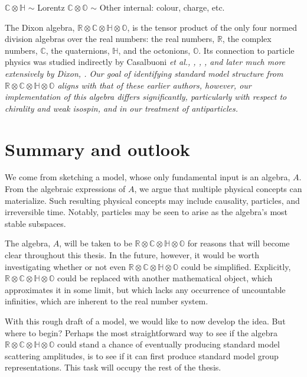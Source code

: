 \documentclass[letterpaper,12pt,titlepage,oneside,final]{book}
\newcommand{\R}{\mathbb{R}}
\newcommand{\C}{\mathbb{C}}
\newcommand{\h}{\mathbb{H}}
\newcommand{\CH}{\mathbb{C}\otimes\mathbb{H}}
\newcommand{\CO}{\mathbb{C}\otimes\mathbb{O}}
\newcommand{\RCHO}{\mathbb{R}\otimes\mathbb{C}\otimes\mathbb{H}\otimes\mathbb{O}}
\begin{document}
\begin{center}  $\CH$ $\sim$ Lorentz \hspace{2cm} $\CO$ $\sim$ Other internal:  colour, charge, etc.
\end{center}

The Dixon algebra, $\RCHO$, is the tensor product of the only four normed division algebras over the real numbers:  the real numbers, $\R$, the complex numbers, $\C$, the quaternions, $\h$, and the octonions, $\mathbb{O}$.  Its connection to particle physics was studied indirectly by Casalbuoni \it et al., \rm \cite{Grass}, \cite{wow}, \cite{wowagain}, and later much more extensively by Dixon, \cite{dixon}.  Our goal of identifying standard model structure from $\RCHO$ aligns with that of these earlier authors, however, our implementation of this algebra differs significantly, particularly with respect to chirality and weak isospin, and in our treatment of antiparticles.


\section{Summary and outlook}

We come from sketching a model,  whose only fundamental input is an algebra, $A$.  
From the  algebraic expressions of $A$, we argue that multiple physical concepts can materialize.  %
Such resulting physical concepts may include causality, particles, and irreversible time.  Notably, particles may be seen to arise as the algebra's most stable subspaces.


The algebra, $A$,  will be taken to be $\RCHO$ for reasons that will become clear throughout this thesis.  In the future, however, it would be worth investigating whether or not even $\RCHO$ could be simplified.  Explicitly, $\RCHO$ could be replaced with another mathematical object, which approximates it in some limit, but which lacks any occurrence of uncountable infinities, which are inherent to the real number system.  


With this rough draft of a model, we would like to now develop the idea.  But where to begin?  Perhaps the most straightforward way to see if the algebra $\RCHO$ could stand a chance of eventually producing standard model scattering amplitudes, is to see if it can first produce standard model group representations.  This task will occupy the rest of the thesis.
\end{document}
